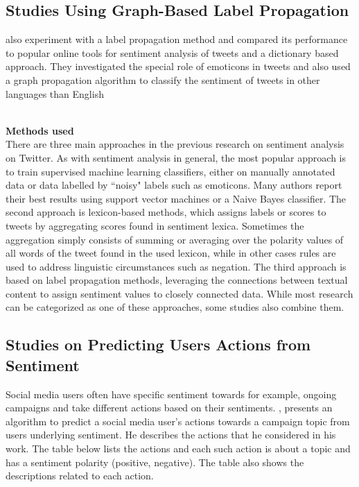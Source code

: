 \subsection{Studies Using Graph-Based Label Propagation}
\cite{ref36} also experiment with a label propagation method and compared its performance
to popular online tools for sentiment analysis of tweets and a dictionary based approach. They
investigated the special role of emoticons in tweets and also used a graph propagation algorithm
to classify the sentiment of tweets in other languages than English \cite{ref37}



\leavevmode\\
\textbf{Methods used}\\
There are three main approaches in the previous research on sentiment analysis on Twitter. As
with sentiment analysis in general, the most popular approach is to train supervised machine
learning classifiers, either on manually annotated data or data labelled by “noisy" labels such as
emoticons. Many authors report their best results using support vector machines or a Naive Bayes
classifier. The second approach is lexicon-based methods, which assigns labels or scores to tweets
by aggregating scores found in sentiment lexica. Sometimes the aggregation simply consists of
summing or averaging over the polarity values of all words of the tweet found in the used lexicon,
while in other cases rules are used to address linguistic circumstances such as negation. The third
approach is based on label propagation methods, leveraging the connections between textual
content to assign sentiment values to closely connected data. While most research can be
categorized as one of these approaches, some studies also combine them.

\subsection{Studies on Predicting Users Actions from Sentiment}
Social media users often have specific sentiment towards for example, ongoing campaigns and
take different actions based on their sentiments. \cite{ref38}, presents an algorithm to predict
a social media user's actions towards a campaign topic from user\textquotesingle s underlying sentiment. He describes the actions that he considered in his work. The table below lists the actions and each such
action is about a topic and has a sentiment polarity (positive, negative). The table also shows the
descriptions related to each action.


